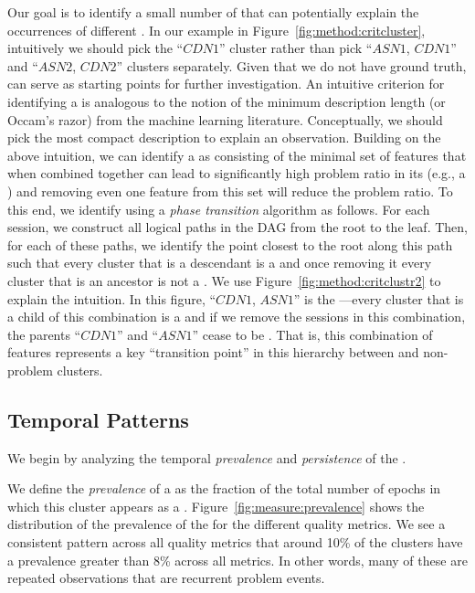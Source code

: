 Our goal is to identify a small number of {\em \criticalclusters} 
that can potentially explain the occurrences of different 
\problemclusters.  
In our example in Figure~\ref{fig:method:critcluster}, intuitively 
we should pick the ``$\mathit{CDN1}$'' cluster rather than pick 
``$\mathit{ASN1}$, $\mathit{CDN1}$'' and ``$\mathit{ASN2}$, 
$\mathit{CDN2}$'' clusters separately.
Given that we do not have ground truth, \criticalclusters can 
serve as  starting points for further investigation. 
%
An intuitive criterion for  identifying a \criticalcluster is 
analogous to the notion of the minimum description length 
(or Occam's razor) from the machine learning literature. 
Conceptually, we should pick the most  compact description
to explain an observation.  Building on the above intuition, 
we can identify a \criticalcluster as consisting of the minimal 
set of features that when combined together can lead to 
significantly high problem ratio in its \cluster
(e.g., a \problemcluster) and removing even one feature
 from this set will reduce the problem ratio. 
To this end, we identify \criticalclusters using a \emph{phase
transition} algorithm as follows. 
For each session, we construct all logical paths in the DAG 
from the root to the leaf.  
Then, for each of these paths, we identify the point closest 
to the root along this path such that every cluster that is a 
descendant  is a \problemcluster and once removing it every 
cluster that is an ancestor is not a \problemcluster.
We use Figure~\ref{fig:method:critclustr2} to explain the intuition. 
In this figure, ``$\mathit{CDN1}$, $\mathit{ASN1}$'' is the 
\criticalcluster---every cluster that is a child of
this combination is a \problemcluster and if we remove the 
sessions in this combination, the parents ``$\mathit{CDN1}$'' 
and ``$\mathit{ASN1}$'' cease to be \problemclusters.
That is, this combination of features represents a key 
``transition point'' in this hierarchy between \problemclusters 
and non-problem clusters. 


\subsection{Temporal Patterns}
\label{subsec:measurement:video:temporal}

We begin by analyzing the temporal \emph{prevalence} and 
\emph{persistence} of the \problemclusters.

We define the \emph{prevalence} of a \problemcluster as the 
fraction of the total number of epochs in which this cluster 
appears as a \problemcluster.  
Figure~\ref{fig:measure:prevalence} shows the distribution of 
the prevalence of the \problemclusters for the different
quality metrics. We see a consistent pattern  across all quality 
metrics that around 10\% of the clusters have a prevalence 
greater than 8\% across all metrics. 
In other words, many of these \problemclusters are repeated 
observations that are recurrent problem events. 

